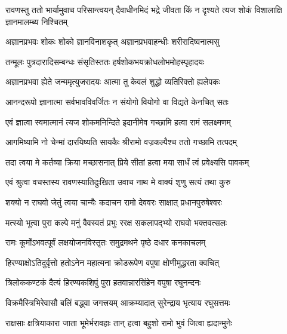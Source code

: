 


\addtocounter{shlokacount}{35}


\threelineshloka
{रावणस्तु ततो भार्यामुवाच परिसान्त्वयन्}
{दैवाधीनमिदं भद्रे जीवता किं न दृश्यते}
{त्यज शोकं विशालाक्षि ज्ञानमालम्ब्य निश्चितम्} %

\twolineshloka
{अज्ञानप्रभवः शोकः शोको ज्ञानविनाशकृत्}
{अज्ञानप्रभवाहन्धीः शरीरादिष्वनात्मसु} %

\twolineshloka
{तन्मूलः पुत्रदारादिसम्बन्धः संसृतिस्ततः}
{हर्षशोकभयक्रोधलोभमोहस्पृहादयः} %

\twolineshloka
{अज्ञानप्रभवा ह्येते जन्ममृत्युजरादयः}
{आत्मा तु केवलं शुद्धो व्यतिरिक्तो ह्यलेपकः} %

\twolineshloka
{आनन्दरूपो ज्ञानात्मा सर्वभावविवर्जितः}
{न संयोगो वियोगो वा विद्यते केनचित् सतः} %

\twolineshloka
{एवं ज्ञात्वा स्वमात्मानं त्यज शोकमनिन्दिते}
{इदानीमेव गच्छामि हत्वा रामं सलक्ष्मणम्} %

\twolineshloka
{आगमिष्यामि नो चेन्मां दारयिष्यति सायकैः}
{श्रीरामो वज्रकल्पैश्च ततो गच्छामि तत्पदम्} %

\twolineshloka
{तदा त्वया मे कर्तव्या क्रिया मच्छासनात् प्रिये}
{सीतां हत्वा मया सार्धं त्वं प्रवेक्ष्यसि पावकम्} %

\twolineshloka
{एवं श्रुत्वा वचस्तस्य रावणस्यातिदुःखिता}
{उवाच नाथ मे वाक्यं शृणु सत्यं तथा कुरु} %

\twolineshloka
{शक्यो न राघवो जेतुं त्वया चान्यैः कदाचन}
{रामो देववरः साक्षात् प्रधानपुरुषेश्वरः} %

\twolineshloka
{मत्स्यो भूत्वा पुरा कल्पे मनुं वैवस्वतं प्रभुः}
{ररक्ष सकलापद्भ्यो राघवो भक्तवत्सलः} %

\twolineshloka
{रामः कूर्मोऽभवत्पूर्वं लक्षयोजनविस्तृतः}
{समुद्रमथने पृष्ठे दधार कनकाचलम्} %

\twolineshloka
{हिरण्याक्षोऽतिदुर्वृत्तो हतोऽनेन महात्मना}
{क्रोडरूपेण वपुषा क्षोणीमुद्धरता क्वचित्} %

\twolineshloka
{त्रिलोककण्टकं दैत्यं हिरण्यकशिपुं पुरा}
{हतवान्नारसिंहेन वपुषा रघुनन्दनः} %

\twolineshloka
{विक्रमैस्त्रिभिरेवासौ बलिं बद्\mbox{}ध्वा जगत्त्रयम्}
{आक्रम्यादात् सुरेन्द्राय भृत्याय रघुसत्तमः} %

\twolineshloka
{राक्षसाः क्षत्रियाकारा जाता भूमेर्भरावहाः}
{तान् हत्वा बहुशो रामो भुवं जित्वा ह्यदान्मुनेः} %

